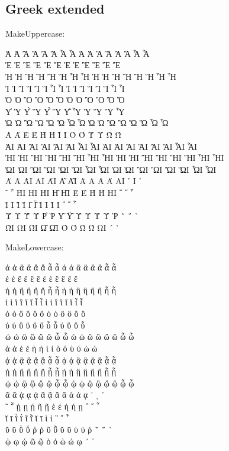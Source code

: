 \documentclass[a4paper]{article}
\begin{document}
\subsection{Greek extended}

MakeUppercase:


\MakeUppercase{ ἀ ἁ ἂ ἃ ἄ ἅ ἆ ἇ Ἀ Ἁ Ἂ Ἃ Ἄ Ἅ Ἆ Ἇ }\\
\MakeUppercase{ ἐ ἑ ἒ ἓ ἔ ἕ     Ἐ Ἑ Ἒ Ἓ Ἔ Ἕ     }\\
\MakeUppercase{ ἠ ἡ ἢ ἣ ἤ ἥ ἦ ἧ Ἠ Ἡ Ἢ Ἣ Ἤ Ἥ Ἦ Ἧ }\\
\MakeUppercase{ ἰ ἱ ἲ ἳ ἴ ἵ ἶ ἷ Ἰ Ἱ Ἲ Ἳ Ἴ Ἵ Ἶ Ἷ }\\
\MakeUppercase{ ὀ ὁ ὂ ὃ ὄ ὅ     Ὀ Ὁ Ὂ Ὃ Ὄ Ὅ     }\\
\MakeUppercase{ ὐ ὑ ὒ ὓ ὔ ὕ ὖ ὗ   Ὑ   Ὓ   Ὕ   Ὗ }\\
\MakeUppercase{ ὠ ὡ ὢ ὣ ὤ ὥ ὦ ὧ Ὠ Ὡ Ὢ Ὣ Ὤ Ὥ Ὦ Ὧ }\\
\MakeUppercase{ ὰ ά ὲ έ ὴ ή ὶ ί ὸ ό ὺ ύ ὼ ώ     }\\
\MakeUppercase{ ᾀ ᾁ ᾂ ᾃ ᾄ ᾅ ᾆ ᾇ ᾈ ᾉ ᾊ ᾋ ᾌ ᾍ ᾎ ᾏ }\\
\MakeUppercase{ ᾐ ᾑ ᾒ ᾓ ᾔ ᾕ ᾖ ᾗ ᾘ ᾙ ᾚ ᾛ ᾜ ᾝ ᾞ ᾟ }\\
\MakeUppercase{ ᾠ ᾡ ᾢ ᾣ ᾤ ᾥ ᾦ ᾧ ᾨ ᾩ ᾪ ᾫ ᾬ ᾭ ᾮ ᾯ }\\
\MakeUppercase{ ᾰ ᾱ ᾲ ᾳ ᾴ   ᾶ ᾷ Ᾰ Ᾱ Ὰ Ά ᾼ ᾽ ι ᾿ }\\
\MakeUppercase{ ῀ ῁ ῂ ῃ ῄ   ῆ ῇ Ὲ Έ Ὴ Ή ῌ ῍ ῎ ῏ }\\
\MakeUppercase{ ῐ ῑ ῒ ΐ     ῖ ῗ Ῐ Ῑ Ὶ Ί   ῝ ῞ ῟ }\\
\MakeUppercase{ ῠ ῡ ῢ ΰ ῤ ῥ ῦ ῧ Ῠ Ῡ Ὺ Ύ Ῥ ῭ ΅ ` }\\
\MakeUppercase{     ῲ ῳ ῴ   ῶ ῷ Ὸ Ό Ὼ Ώ ῼ ´ ῾   }

MakeLowercase:

\MakeLowercase{ ἀ ἁ ἂ ἃ ἄ ἅ ἆ ἇ Ἀ Ἁ Ἂ Ἃ Ἄ Ἅ Ἆ Ἇ }\\
\MakeLowercase{ ἐ ἑ ἒ ἓ ἔ ἕ     Ἐ Ἑ Ἒ Ἓ Ἔ Ἕ     }\\
\MakeLowercase{ ἠ ἡ ἢ ἣ ἤ ἥ ἦ ἧ Ἠ Ἡ Ἢ Ἣ Ἤ Ἥ Ἦ Ἧ }\\
\MakeLowercase{ ἰ ἱ ἲ ἳ ἴ ἵ ἶ ἷ Ἰ Ἱ Ἲ Ἳ Ἴ Ἵ Ἶ Ἷ }\\
\MakeLowercase{ ὀ ὁ ὂ ὃ ὄ ὅ     Ὀ Ὁ Ὂ Ὃ Ὄ Ὅ     }\\
\MakeLowercase{ ὐ ὑ ὒ ὓ ὔ ὕ ὖ ὗ   Ὑ   Ὓ   Ὕ   Ὗ }\\
\MakeLowercase{ ὠ ὡ ὢ ὣ ὤ ὥ ὦ ὧ Ὠ Ὡ Ὢ Ὣ Ὤ Ὥ Ὦ Ὧ }\\
\MakeLowercase{ ὰ ά ὲ έ ὴ ή ὶ ί ὸ ό ὺ ύ ὼ ώ     }\\
\MakeLowercase{ ᾀ ᾁ ᾂ ᾃ ᾄ ᾅ ᾆ ᾇ ᾈ ᾉ ᾊ ᾋ ᾌ ᾍ ᾎ ᾏ }\\
\MakeLowercase{ ᾐ ᾑ ᾒ ᾓ ᾔ ᾕ ᾖ ᾗ ᾘ ᾙ ᾚ ᾛ ᾜ ᾝ ᾞ ᾟ }\\
\MakeLowercase{ ᾠ ᾡ ᾢ ᾣ ᾤ ᾥ ᾦ ᾧ ᾨ ᾩ ᾪ ᾫ ᾬ ᾭ ᾮ ᾯ }\\
\MakeLowercase{ ᾰ ᾱ ᾲ ᾳ ᾴ   ᾶ ᾷ Ᾰ Ᾱ Ὰ Ά ᾼ ᾽ ι ᾿ }\\
\MakeLowercase{ ῀ ῁ ῂ ῃ ῄ   ῆ ῇ Ὲ Έ Ὴ Ή ῌ ῍ ῎ ῏ }\\
\MakeLowercase{ ῐ ῑ ῒ ΐ     ῖ ῗ Ῐ Ῑ Ὶ Ί   ῝ ῞ ῟ }\\
\MakeLowercase{ ῠ ῡ ῢ ΰ ῤ ῥ ῦ ῧ Ῠ Ῡ Ὺ Ύ Ῥ ῭ ΅ ` }\\
\MakeLowercase{     ῲ ῳ ῴ   ῶ ῷ Ὸ Ό Ὼ Ώ ῼ ´ ῾   }
\end{document}
